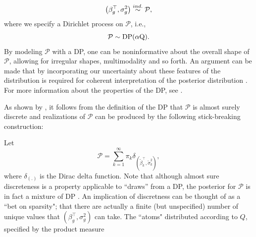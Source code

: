 \begin{equation*}
\left(\beta_g^\top,\sigma^2_g\right) \stackrel{ind.}{\sim} \mathcal{P},
\end{equation*}
where we specify a Dirichlet process on $\mathcal{P}$, i.e.,
\begin{equation*}
\mathcal{P} \sim \operatorname{DP}(\alpha \mbox{Q}).
\end{equation*}
\iftoggle{thesis}{
The use of this prior, due to \citet{ferguson}, is a distribution over probability distributions, such that for any finite disjoint partition $\{A_i\}_{i>=1}^n$ on $\mathbb{R}^p$, $\mathcal{P}$ is a random measure such that the joint distribution $\left(\mathcal{P}(A_1),\ldots,\mathcal{P}(A_n)\right) \sim \op{Dir}\left(\alpha Q(A_1),\ldots,\alpha Q(A_n)\right).$ The DP has two parameters: $Q$, the base measure, represents a prior guess at the distribution. $\alpha$, the concentration parameter expresses the degree to which $\mathcal{P}$ will agree with $Q$ on any set $A$. This follows from the definition given above and known properties of the Dirichlet distribution, i.e., $\op{E}\left(\mathcal{P}(A)\right)=Q(A)$, and $\op{V}\left(\mathcal{P}(A)\right)=\frac{Q(A)(1 - Q(A)}{\alpha + 1}$, showing that $\mathcal{P}(A) \stackrel{p}{\rightarrow} Q(A)$ as $\alpha \rightarrow \infty$ for any set $A$.
}{}
By modeling $\mathcal{P}$ with a DP, one can be noninformative about the overall shape of $\mathcal{P}$, allowing for irregular shapes, multimodality and so forth. An argument can be made that by incorporating our uncertainty about these features of the distribution is required for coherent interpretation of the posterior distribution \citep{walker2010bayesian}. For more information about the properties of the DP, see \cite{ferguson}.

As shown by \citet{sethuraman}, it follows from the definition of the DP that $\mathcal{P}$ is almost surely discrete and realizations of $\mathcal{P}$ can be produced by the following stick-breaking construction:

Let 
\begin{equation}
\label{eq:P}
\mathcal{P} =\sum_{k=1}^\infty \pi_k \delta_{\left(\tilde{\beta}_k^\top ,\tilde{\sigma}^2_k\right)},
\end{equation}
where $\delta_{(.)}$ is the Dirac delta function. Note that although almost sure discreteness is a property applicable to ``draws'' from a DP, the posterior for $\mathcal{P}$ is in fact a mixture of DP \citep{antoniak}. An implication of discretness can be thought of as a ``bet on sparsity"; that there are actually a finite (but unspecified) number of unique values that $(\beta_g^\top,\sigma^2_g)$ can take.  
 The ``atoms" distributed according to $Q$, specified by the product measure

